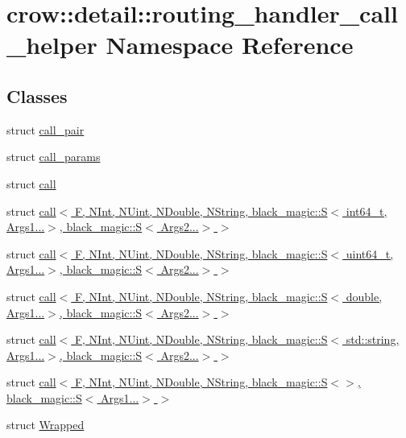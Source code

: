 \hypertarget{namespacecrow_1_1detail_1_1routing__handler__call__helper}{\section{crow\-:\-:detail\-:\-:routing\-\_\-handler\-\_\-call\-\_\-helper Namespace Reference}
\label{namespacecrow_1_1detail_1_1routing__handler__call__helper}
}
\subsection*{Classes}
\begin{DoxyCompactItemize}
\item 
struct \hyperlink{structcrow_1_1detail_1_1routing__handler__call__helper_1_1call__pair}{call\-\_\-pair}
\item 
struct \hyperlink{structcrow_1_1detail_1_1routing__handler__call__helper_1_1call__params}{call\-\_\-params}
\item 
struct \hyperlink{structcrow_1_1detail_1_1routing__handler__call__helper_1_1call}{call}
\item 
struct \hyperlink{structcrow_1_1detail_1_1routing__handler__call__helper_1_1call_3_01_f_00_01_n_int_00_01_n_uint_0b6a35a476dfcab9d942547331be456a9}{call$<$ F, N\-Int, N\-Uint, N\-Double, N\-String, black\-\_\-magic\-::\-S$<$ int64\-\_\-t, Args1...$>$, black\-\_\-magic\-::\-S$<$ Args2...$>$ $>$}
\item 
struct \hyperlink{structcrow_1_1detail_1_1routing__handler__call__helper_1_1call_3_01_f_00_01_n_int_00_01_n_uint_00ad4e6269b7fa1968d50bbffd43a8f02}{call$<$ F, N\-Int, N\-Uint, N\-Double, N\-String, black\-\_\-magic\-::\-S$<$ uint64\-\_\-t, Args1...$>$, black\-\_\-magic\-::\-S$<$ Args2...$>$ $>$}
\item 
struct \hyperlink{structcrow_1_1detail_1_1routing__handler__call__helper_1_1call_3_01_f_00_01_n_int_00_01_n_uint_0b30fc35e23f441513a63571edf36fc02}{call$<$ F, N\-Int, N\-Uint, N\-Double, N\-String, black\-\_\-magic\-::\-S$<$ double, Args1...$>$, black\-\_\-magic\-::\-S$<$ Args2...$>$ $>$}
\item 
struct \hyperlink{structcrow_1_1detail_1_1routing__handler__call__helper_1_1call_3_01_f_00_01_n_int_00_01_n_uint_0d6c3c1bf426d7dfb9e3165c9ff3fd2f3}{call$<$ F, N\-Int, N\-Uint, N\-Double, N\-String, black\-\_\-magic\-::\-S$<$ std\-::string, Args1...$>$, black\-\_\-magic\-::\-S$<$ Args2...$>$ $>$}
\item 
struct \hyperlink{structcrow_1_1detail_1_1routing__handler__call__helper_1_1call_3_01_f_00_01_n_int_00_01_n_uint_0d7ef20f9a959e64c78052cf52ae9f097}{call$<$ F, N\-Int, N\-Uint, N\-Double, N\-String, black\-\_\-magic\-::\-S$<$$>$, black\-\_\-magic\-::\-S$<$ Args1...$>$ $>$}
\item 
struct \hyperlink{structcrow_1_1detail_1_1routing__handler__call__helper_1_1_wrapped}{Wrapped}
\end{DoxyCompactItemize}

